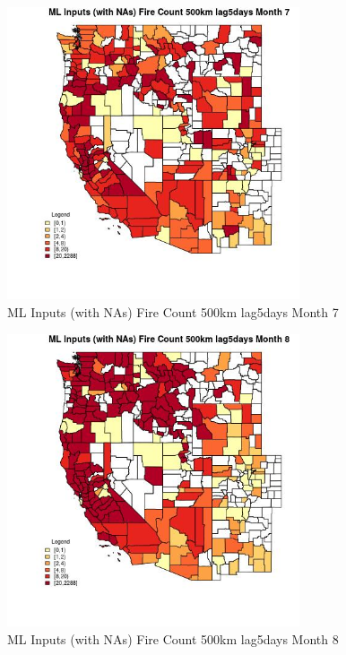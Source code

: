 \begin{figure} 
\centering  
\includegraphics[width=0.77\textwidth]{Code_Outputs/Report_ML_input_PM25_Step4_part_e_de_duplicated_aves_compiled_2019-05-20wNAs_CountyFire_Count_500km_lag5daysmedianMonth7.jpg} 
\caption{\label{fig:Report_ML_input_PM25_Step4_part_e_de_duplicated_aves_compiled_2019-05-20wNAsCountyFire_Count_500km_lag5daysmedianMonth7}ML Inputs (with NAs) Fire Count 500km lag5days Month 7} 
\end{figure} 
 

\begin{figure} 
\centering  
\includegraphics[width=0.77\textwidth]{Code_Outputs/Report_ML_input_PM25_Step4_part_e_de_duplicated_aves_compiled_2019-05-20wNAs_CountyFire_Count_500km_lag5daysmedianMonth8.jpg} 
\caption{\label{fig:Report_ML_input_PM25_Step4_part_e_de_duplicated_aves_compiled_2019-05-20wNAsCountyFire_Count_500km_lag5daysmedianMonth8}ML Inputs (with NAs) Fire Count 500km lag5days Month 8} 
\end{figure} 
 

